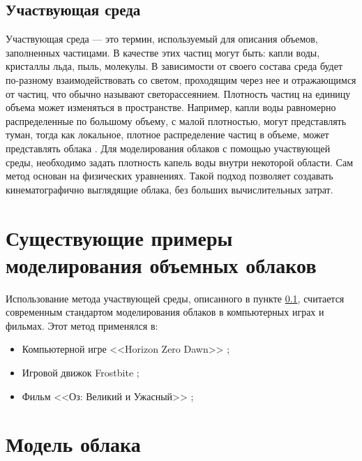 \subsection{Участвующая среда} 
\label{partmediaref}
Участвующая среда — это термин, используемый для описания объемов, заполненных частицами. В качестве этих частиц могут быть: капли воды, кристаллы льда, пыль, молекулы. В зависимости от своего состава среда будет по-разному взаимодействовать со светом, проходящим через нее и отражающимся от частиц, что обычно называют светорассеянием. Плотность частиц на единицу объема может изменяться в пространстве. Например, капли воды равномерно распределенные по большому объему, с малой плотностью, могут представлять туман, тогда как локальное, плотное распределение частиц в объеме, может представлять облака \cite{pm}. Для моделирования облаков с помощью участвующей среды, необходимо задать плотность капель воды внутри некоторой области. Сам метод основан на физических уравнениях.
Такой подход позволяет создавать кинематографично выглядящие облака, без больших вычислительных затрат.  


\section{Существующие примеры моделирования объемных облаков}

Использование метода участвующей среды, описанного в пункте \ref{partmediaref}, считается современным стандартом моделирования облаков в компьютерных играх и фильмах. Этот метод применялся в:
\begin{itemize}
	\item Компьютерной игре <<Horizon Zero Dawn>> \cite{hzd};
	\item Игровой движок Frostbite \cite{frostbite};
	\item Фильм <<Оз: Великий и Ужасный>> \cite{oz};
\end{itemize}



\newpage

\section{Модель облака}

